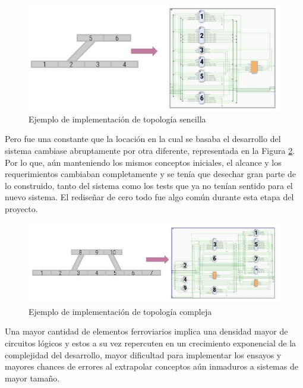 		\begin{figure}[htbp!]
			\centering
			\includegraphics[scale=.5]{./Figures/Grafo_VHDL}
			\caption{Ejemplo de implementación de topología sencilla}
			\label{fig:CESE_1}
		\end{figure}	
		
		\vspace{5cm}
		
		Pero fue una constante que la locación en la cual se basaba el desarrollo del sistema cambiase abruptamente por otra diferente, representada en la Figura \ref{fig:CESE_2}. Por lo que, aún manteniendo los mismos conceptos iniciales, el alcance y los requerimientos cambiaban completamente y se tenía que desechar gran parte de lo construido, tanto del sistema como los tests que ya no tenían sentido para el nuevo sistema. El rediseñar de cero todo fue algo común durante esta etapa del proyecto.
		
		\begin{figure}[htbp!]
			\centering
			\includegraphics[scale=.5]{./Figures/Grafo_VHDL_B}
			\caption{Ejemplo de implementación de topología compleja}
			\label{fig:CESE_2}
		\end{figure}
			
		Una mayor cantidad de elementos ferroviarios implica una densidad mayor de circuitos lógicos y estos a su vez repercuten en un crecimiento exponencial de la complejidad del desarrollo, mayor dificultad para implementar los ensayos y mayores chances de errores al extrapolar conceptos aún inmaduros a sistemas de mayor tamaño.
		
